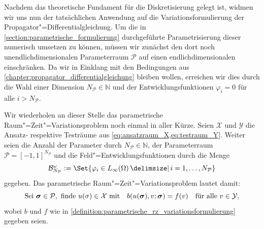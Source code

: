 \documentclass[../main.tex]{subfiles}
\begin{document}
Nachdem das theoretische Fundament für die Diskretisierung gelegt ist, widmen wir uns nun der tatsächlichen Anwendung auf die Variationsformulierung der Propagator"=Differentialgleichung.
Um die in \cref{section:parametrische_formulierung} durchgeführte Parametrisierung dieser numerisch umsetzen zu können, müssen wir zunächst den dort noch unendlichdimensionalen Parameterraum $\mathcal P$ auf einen endlichdimensionalen einschränken.
Da wir in Einklang mit den Bedingungen aus \cref{chapter:propagator_differentialgleichung} bleiben wollen, erreichen wir dies durch die Wahl einer Dimension $N_{\mathcal P} \in \mathbb{N}$ und der Entwicklungsfunktionen $\varphi_{i} = 0$ für alle $i > N_{\mathcal P}$.

Wir wiederholen an dieser Stelle das parametrische Raum"=Zeit"=Variationsproblem noch einmal in aller Kürze.
Seien $\mathcal X$ und $\mathcal Y$ die Ansatz- respektive Testräume aus \cref{eq:ansatzraum_X,eq:testraum_Y}.
Weiter seien die Anzahl der Parameter durch $N_{\mathcal P} \in \mathbb{N}$, der Parameterraum $\mathcal P = [-1, 1]^{N_\mathcal P}$ und die Feld"=Entwicklungsfunktionen durch die Menge
\begin{equation}
    \mathcal B^{\omega}_{N_{\mathcal P}} := \Set{ \varphi_{i} \in L_{\infty}(\Omega) \given i = 1, \dots, N_{\mathcal P}}
\end{equation}
gegeben.
Das parametrische Raum"=Zeit"=Variationsproblem lautet damit:
\begin{equation}\label{eq:wiederholung_variationsproblem}
    \text{Sei }\bm \sigma \in \mathcal P, \text{ finde } u(\sigma) \in \mathcal X \text{ mit} \quad b(u(\bm \sigma), v; \bm \sigma) = f(v) \quad \fa v \in \mathcal Y,
\end{equation}
wobei $b$ und $f$ wie in \cref{definition:parametrische_rz_variationsformulierung} gegeben seien.
\end{document}
